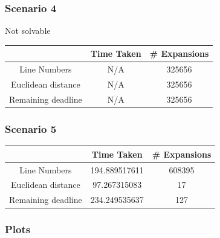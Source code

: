 \documentclass[paper=a4, fontsize=11pt]{scrartcl} %
\numberwithin{equation}{section} %
\numberwithin{figure}{section} %
\numberwithin{table}{section} %
\begin{document}
\subsubsection{Scenario 4}
Not solvable\\

\begin{tabular}{|c|c|c|}
\hline 
 & Time Taken & \# Expansions \\ 
\hline 
Line Numbers & N/A & 325656 \\ 
\hline 
Euclidean distance & N/A & 325656 \\ 
\hline 
Remaining deadline & N/A & 325656 \\ 
\hline 
\end{tabular} 

\subsubsection{Scenario 5}
\begin{tabular}{|c|c|c|}
\hline 
 & Time Taken & \# Expansions \\ 
\hline 
Line Numbers & 194.889517611 & 608395 \\ 
\hline 
Euclidean distance & 97.267315083 & 17 \\ 
\hline 
Remaining deadline & 234.249535637 & 127 \\ 
\hline 
\end{tabular} 



\subsubsection{Plots}
\end{document}
